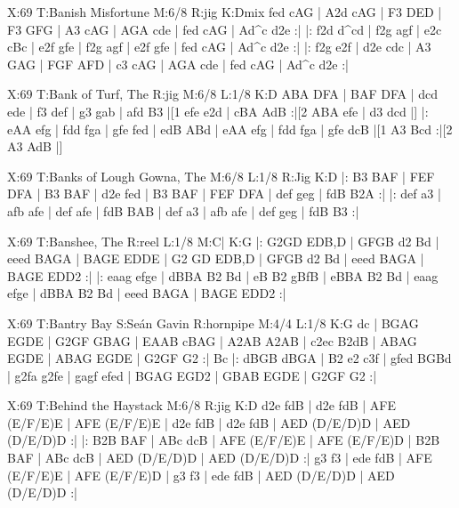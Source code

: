 \documentclass[letterpaper]{article}
\begin{document}
\begin{abc}[name]
X:69
T:Banish Misfortune
M:6/8
R:jig
K:Dmix
fed cAG | A2d cAG | F3 DED | F3 GFG |
A3 cAG | AGA cde | fed cAG | Ad^c d2e :|
|: f2d d^cd | f2g agf | e2c cBc | e2f gfe |
f2g agf | e2f gfe | fed cAG | Ad^c d2e :|
|: f2g e2f | d2e cdc | A3 GAG | FGF AFD |
c3 cAG | AGA cde | fed cAG | Ad^c d2e :|
\end{abc}

\begin{abc}[name]
X:69
T:Bank of Turf, The
R:jig
M:6/8
L:1/8
K:D
ABA DFA | BAF DFA | dcd ede | f3 def |
g3 gab | afd B3 |[1 efe e2d | cBA AdB :|[2 ABA efe | d3 dcd |]
|: eAA efg | fdd fga | gfe fed | edB ABd |
eAA efg | fdd fga | gfe dcB |[1 A3 Bcd :|[2 A3 AdB |]
\end{abc}

\begin{abc}[name]
X:69
T:Banks of Lough Gowna, The
M:6/8
L:1/8
R:Jig
K:D
|: B3 BAF | FEF DFA | B3 BAF | d2e fed |
B3 BAF | FEF DFA | def geg | fdB B2A :|
|: def a3 | afb afe | def afe | fdB BAB |
def a3 | afb afe | def geg | fdB B3 :|
\end{abc}

\begin{abc}[name]
X:69
T:Banshee, The
R:reel
L:1/8
M:C|
K:G
|: G2GD EDB,D | GFGB d2 Bd | eeed BAGA | BAGE EDDE |
 G2 GD EDB,D | GFGB d2 Bd | eeed BAGA | BAGE EDD2 :|
|: eaag efge | dBBA B2 Bd | eB B2 gBfB | eBBA B2 Bd |
 eaag efge | dBBA B2 Bd | eeed BAGA | BAGE EDD2 :|
\end{abc}

\begin{abc}[name]
X:69
T:Bantry Bay
S:Seán Gavin
R:hornpipe
M:4/4
L:1/8
K:G
dc | BGAG EGDE | G2GF GBAG | EAAB cBAG | A2AB A2AB |
c2ec B2dB | ABAG EGDE | ABAG EGDE | G2GF G2 :|
Bc |: dBGB dBGA | B2 e2 c3f | gfed BGBd | g2fa g2fe |
gagf efed | BGAG EGD2 | GBAB EGDE | G2GF G2 :|
\end{abc}

\begin{abc}[name]
X:69
T:Behind the Haystack
M:6/8
R:jig
K:D
d2e fdB | d2e fdB | AFE (E/F/E)E | AFE (E/F/E)E |
d2e fdB | d2e fdB | AED (D/E/D)D | AED (D/E/D)D :|
|: B2B BAF | ABc dcB | AFE (E/F/E)E | AFE (E/F/E)D |
B2B BAF | ABc dcB | AED (D/E/D)D | AED (D/E/D)D :|
g3 f3 | ede fdB | AFE (E/F/E)E | AFE (E/F/E)D |
g3 f3 | ede fdB | AED (D/E/D)D | AED (D/E/D)D :|
\end{abc}
\end{document}
